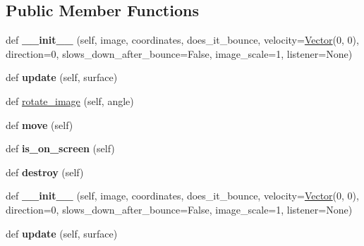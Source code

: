 \subsection*{Public Member Functions}
\begin{DoxyCompactItemize}
\item 
def {\bfseries \+\_\+\+\_\+init\+\_\+\+\_\+} (self, image, coordinates, does\+\_\+it\+\_\+bounce, velocity=\hyperlink{classVector_1_1Vector}{Vector}(0, 0), direction=0, slows\+\_\+down\+\_\+after\+\_\+bounce=False, image\+\_\+scale=1, listener=None)\hypertarget{classMovingObject_1_1MovingObject_a237013581377a7e5f7163d47254dbce8}{}\label{classMovingObject_1_1MovingObject_a237013581377a7e5f7163d47254dbce8}

\item 
def {\bfseries update} (self, surface)\hypertarget{classMovingObject_1_1MovingObject_ab8d51c9a7e120afad47200b6166d2530}{}\label{classMovingObject_1_1MovingObject_ab8d51c9a7e120afad47200b6166d2530}

\item 
def \hyperlink{classMovingObject_1_1MovingObject_ac2299da57e4ff40983ed385c33ac4c63}{rotate\+\_\+image} (self, angle)
\item 
def {\bfseries move} (self)\hypertarget{classMovingObject_1_1MovingObject_a6060cd55441bc6f9473c4ad5520adc8c}{}\label{classMovingObject_1_1MovingObject_a6060cd55441bc6f9473c4ad5520adc8c}

\item 
def {\bfseries is\+\_\+on\+\_\+screen} (self)\hypertarget{classMovingObject_1_1MovingObject_a3c44ea1a39ee9bd15bb16295a7f6bf75}{}\label{classMovingObject_1_1MovingObject_a3c44ea1a39ee9bd15bb16295a7f6bf75}

\item 
def {\bfseries destroy} (self)\hypertarget{classMovingObject_1_1MovingObject_a7deae65ed90400dab791e8611e86c833}{}\label{classMovingObject_1_1MovingObject_a7deae65ed90400dab791e8611e86c833}

\item 
def {\bfseries \+\_\+\+\_\+init\+\_\+\+\_\+} (self, image, coordinates, does\+\_\+it\+\_\+bounce, velocity=\hyperlink{classVector_1_1Vector}{Vector}(0, 0), direction=0, slows\+\_\+down\+\_\+after\+\_\+bounce=False, image\+\_\+scale=1, listener=None)\hypertarget{classMovingObject_1_1MovingObject_a237013581377a7e5f7163d47254dbce8}{}\label{classMovingObject_1_1MovingObject_a237013581377a7e5f7163d47254dbce8}

\item 
def {\bfseries update} (self, surface)\hypertarget{classMovingObject_1_1MovingObject_ab8d51c9a7e120afad47200b6166d2530}{}\label{classMovingObject_1_1MovingObject_ab8d51c9a7e120afad47200b6166d2530}


\end{DoxyCompactItemize}
